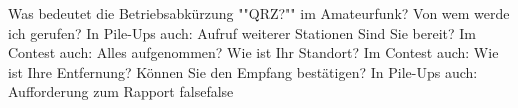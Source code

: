     {Was bedeutet die Betriebsabkürzung ""QRZ?"" im Amateurfunk?}
    {Von wem werde ich gerufen? In Pile-Ups auch: Aufruf weiterer Stationen}
    {Sind Sie bereit? Im Contest auch: Alles aufgenommen?}
    {Wie ist Ihr Standort? Im Contest auch: Wie ist Ihre Entfernung?}
    {Können Sie den Empfang bestätigen? In Pile-Ups auch: Aufforderung zum Rapport}
    {false}{false}
